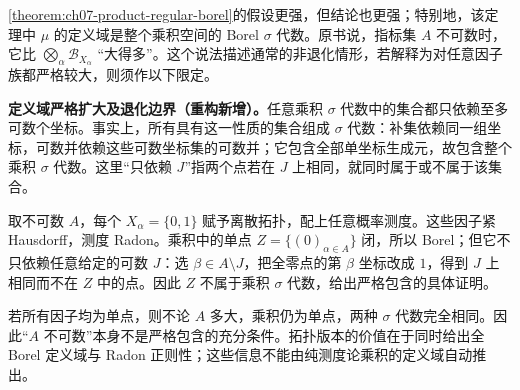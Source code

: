 \documentclass[../../main.tex]{subfiles}
\begin{document}
\cref{theorem:ch07-product-regular-borel}的假设更强，但结论也更强；特别地，该定理中 $\mu$ 的定义域是整个乘积空间的 Borel $\sigma$ 代数。原书说，指标集 $A$ 不可数时，它比 $\bigotimes_\alpha\mathscr B_{X_\alpha}$ “大得多”。这个说法描述通常的非退化情形，若解释为对任意因子族都严格较大，则须作以下限定。
\begin{remark}
\textbf{定义域严格扩大及退化边界（重构新增）。}任意乘积 $\sigma$ 代数中的集合都只依赖至多可数个坐标。事实上，所有具有这一性质的集合组成 $\sigma$ 代数：补集依赖同一组坐标，可数并依赖这些可数坐标集的可数并；它包含全部单坐标生成元，故包含整个乘积 $\sigma$ 代数。这里“只依赖 $J$”指两个点若在 $J$ 上相同，就同时属于或不属于该集合。

取不可数 $A$，每个 $X_\alpha=\{0,1\}$ 赋予离散拓扑，配上任意概率测度。这些因子紧 Hausdorff，测度 Radon。乘积中的单点 $Z=\{(0)_{\alpha\in A}\}$ 闭，所以 Borel；但它不只依赖任意给定的可数 $J$：选 $\beta\in A\setminus J$，把全零点的第 $\beta$ 坐标改成 $1$，得到 $J$ 上相同而不在 $Z$ 中的点。因此 $Z$ 不属于乘积 $\sigma$ 代数，给出严格包含的具体证明。

若所有因子均为单点，则不论 $A$ 多大，乘积仍为单点，两种 $\sigma$ 代数完全相同。因此“$A$ 不可数”本身不是严格包含的充分条件。拓扑版本的价值在于同时给出全 Borel 定义域与 Radon 正则性；这些信息不能由纯测度论乘积的定义域自动推出。
\end{remark}
\end{document}
